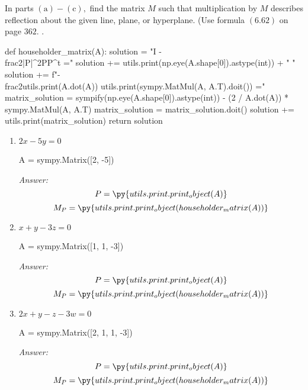 \documentclass[letterpaper]{article}
\newcommand{\ans}{\textit{Answer: }}
\newenvironment{question}[2][Question]{\begin{trivlist}
\item[\hskip \labelsep {\bfseries #1}\hskip \labelsep {\bfseries #2.}]}{\end{trivlist}}
\newcommand{\printobj}[1]{\py{utils.print.print_object(#1)}}
\begin{document}
\begin{question}{6.83}
  In parts $(\mathrm{a})-(\mathrm{c}),$ find the matrix $M$ such that multiplication by $M$ describes
  reflection about the given line, plane, or hyperplane. (Use formula $(6.62)$ on
  page $362 .$ .

  \begin{pycode}
def householder_matrix(A):
  solution = "I - \\frac{2}{|P|^2}PP^t ="
  solution += utils.print(np.eye(A.shape[0]).astype(int)) + " "
  solution += f"- \\frac{{2}}{{{utils.print(A.dot(A))}}} {utils.print(sympy.MatMul(A, A.T).doit())} ="
  matrix_solution = sympify(np.eye(A.shape[0]).astype(int)) - (2 / A.dot(A)) * sympy.MatMul(A, A.T)
  matrix_solution = matrix_solution.doit()
  solution += utils.print(matrix_solution)
  return solution 
  \end{pycode}

  \begin{enumerate}
    \item $2 x-5 y=0$
    \begin{pycode}
A = sympy.Matrix([2, -5])
    \end{pycode}

    \ans 
    $$P = \printobj{A}$$
    $$M_P = \printobj{householder_matrix(A)}$$

    \item $x+y-3 z=0$
    \begin{pycode}
A = sympy.Matrix([1, 1, -3])
    \end{pycode}

    \ans 
    $$P = \printobj{A}$$
    $$M_P = \printobj{householder_matrix(A)}$$

    \item $2 x+y-z-3 w=0$
    \begin{pycode}
A = sympy.Matrix([2, 1, 1, -3])
    \end{pycode}

    \ans 
    $$P = \printobj{A}$$
    $$M_P = \printobj{householder_matrix(A)}$$
  \end{enumerate}

\end{question}
\end{document}
